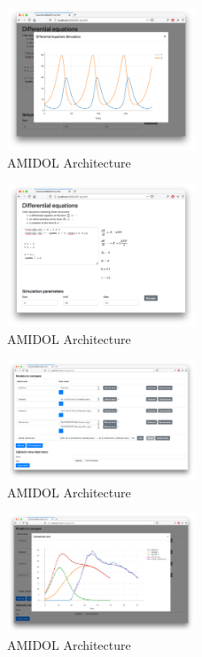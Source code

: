 \documentclass[12pt]{galois-whitepaper}
\begin{document}
\begin{figure}
  \centering
  \includegraphics[width=0.5\textwidth]{figs/LaTex_VDSOL_results.png}
  \caption{AMIDOL Architecture}
  \label{Fig:Arch}
\end{figure}

\begin{figure}
  \centering
  \includegraphics[width=0.5\textwidth]{figs/LaTeX_VDSOL.png}
  \caption{AMIDOL Architecture}
  \label{Fig:Arch}
\end{figure}

\begin{figure}
  \centering
  \includegraphics[width=0.5\textwidth]{figs/SIIR_setup_comparision.png}
  \caption{AMIDOL Architecture}
  \label{Fig:Arch}
\end{figure}

\begin{figure}
  \centering
  \includegraphics[width=0.5\textwidth]{figs/SIIR_visualize_comparision.png}
  \caption{AMIDOL Architecture}
  \label{Fig:Arch}
\end{figure}
\end{document}
